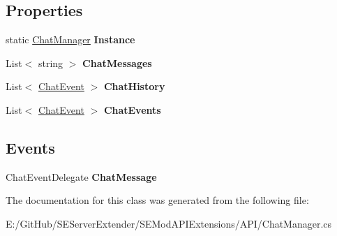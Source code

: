 \subsection*{Properties}
\begin{DoxyCompactItemize}
\item 
\hypertarget{class_s_e_mod_a_p_i_extensions_1_1_a_p_i_1_1_chat_manager_aad7ec3c4d480c9ea6c43ab78630b2f53}{}static \hyperlink{class_s_e_mod_a_p_i_extensions_1_1_a_p_i_1_1_chat_manager}{Chat\+Manager} {\bfseries Instance}\label{class_s_e_mod_a_p_i_extensions_1_1_a_p_i_1_1_chat_manager_aad7ec3c4d480c9ea6c43ab78630b2f53}

\item 
\hypertarget{class_s_e_mod_a_p_i_extensions_1_1_a_p_i_1_1_chat_manager_a1c12d98f73057b0569ed3589a122641a}{}List$<$ string $>$ {\bfseries Chat\+Messages}\label{class_s_e_mod_a_p_i_extensions_1_1_a_p_i_1_1_chat_manager_a1c12d98f73057b0569ed3589a122641a}

\item 
\hypertarget{class_s_e_mod_a_p_i_extensions_1_1_a_p_i_1_1_chat_manager_a1aea0139b936dc39cb56e5becd724a66}{}List$<$ \hyperlink{struct_s_e_mod_a_p_i_extensions_1_1_a_p_i_1_1_chat_manager_1_1_chat_event}{Chat\+Event} $>$ {\bfseries Chat\+History}\label{class_s_e_mod_a_p_i_extensions_1_1_a_p_i_1_1_chat_manager_a1aea0139b936dc39cb56e5becd724a66}

\item 
\hypertarget{class_s_e_mod_a_p_i_extensions_1_1_a_p_i_1_1_chat_manager_ac5e352d2ccee8c41bba272bf9903be8c}{}List$<$ \hyperlink{struct_s_e_mod_a_p_i_extensions_1_1_a_p_i_1_1_chat_manager_1_1_chat_event}{Chat\+Event} $>$ {\bfseries Chat\+Events}\label{class_s_e_mod_a_p_i_extensions_1_1_a_p_i_1_1_chat_manager_ac5e352d2ccee8c41bba272bf9903be8c}

\end{DoxyCompactItemize}
\subsection*{Events}
\begin{DoxyCompactItemize}
\item 
\hypertarget{class_s_e_mod_a_p_i_extensions_1_1_a_p_i_1_1_chat_manager_a58e8b41c56704dbd3a3a25bff399b65c}{}Chat\+Event\+Delegate {\bfseries Chat\+Message}\label{class_s_e_mod_a_p_i_extensions_1_1_a_p_i_1_1_chat_manager_a58e8b41c56704dbd3a3a25bff399b65c}

\end{DoxyCompactItemize}


The documentation for this class was generated from the following file\+:\begin{DoxyCompactItemize}
\item 
E\+:/\+Git\+Hub/\+S\+E\+Server\+Extender/\+S\+E\+Mod\+A\+P\+I\+Extensions/\+A\+P\+I/Chat\+Manager.\+cs\end{DoxyCompactItemize}
